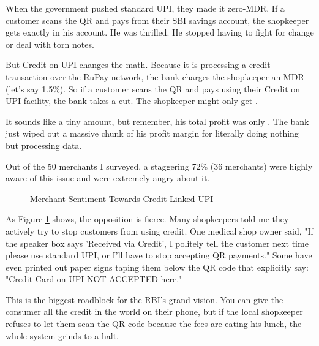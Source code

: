 When the government pushed standard UPI, they made it zero-MDR. If a customer scans the QR and pays  from their SBI savings account, the shopkeeper gets exactly  in his account. He was thrilled. He stopped having to fight for change or deal with torn notes.

But Credit on UPI changes the math. Because it is processing a credit transaction over the RuPay network, the bank charges the shopkeeper an MDR (let's say 1.5\%). So if a customer scans the QR and pays  using their Credit on UPI facility, the bank takes a cut. The shopkeeper might only get .

It sounds like a tiny amount, but remember, his total profit was only . The bank just wiped out a massive chunk of his profit margin for literally doing nothing but processing data.

Out of the 50 merchants I surveyed, a staggering 72\% (36 merchants) were highly aware of this issue and were extremely angry about it.

\begin{figure}[H]
\centering
{}
\caption{Merchant Sentiment Towards Credit-Linked UPI}
\label{fig:merchant_sentiment}
\end{figure}

As Figure \ref{fig:merchant_sentiment} shows, the opposition is fierce. Many shopkeepers told me they actively try to stop customers from using credit. One medical shop owner said, "If the speaker box says 'Received via Credit', I politely tell the customer next time please use standard UPI, or I'll have to stop accepting QR payments." Some have even printed out paper signs taping them below the QR code that explicitly say: "Credit Card on UPI NOT ACCEPTED here."

This is the biggest roadblock for the RBI's grand vision. You can give the consumer all the credit in the world on their phone, but if the local shopkeeper refuses to let them scan the QR code because the fees are eating his lunch, the whole system grinds to a halt.

